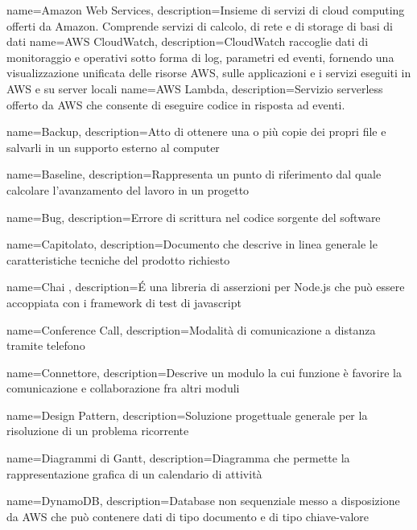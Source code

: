{
	name={Amazon Web Services},
	description={Insieme di servizi di cloud computing offerti da Amazon. Comprende servizi di calcolo, di rete e di storage di basi di dati}
}
{
	name={AWS CloudWatch},
	description={CloudWatch raccoglie dati di monitoraggio e operativi sotto forma di log, parametri ed eventi, fornendo una visualizzazione unificata delle risorse AWS, sulle applicazioni e i servizi eseguiti in AWS e su server locali}
}
{
	name={AWS Lambda},
	description={Servizio serverless offerto da AWS che consente di eseguire codice in risposta ad eventi.}
	{\newpage}
}

{
	name={Backup},
	description={Atto di ottenere una o più copie dei propri file e salvarli in un supporto esterno al computer}
}

{
	name={Baseline},
	description={Rappresenta un punto di riferimento dal quale calcolare l’avanzamento del lavoro in un progetto}
}

{
	name={Bug},
	description={Errore di scrittura nel codice sorgente del software}
	{\newpage}
}

{
	name={Capitolato},
	description={Documento che descrive in linea generale le caratteristiche tecniche del prodotto richiesto}
}

{
	name={Chai },
	description={É una libreria di asserzioni per Node.js che può essere accoppiata con i framework di test di javascript}
}

{
	name={Conference Call},
	description={Modalità di comunicazione a distanza tramite telefono}
}

{
	name={Connettore},
	description={Descrive un modulo la cui funzione è favorire la comunicazione e collaborazione fra altri moduli}
	{\newpage}
}

{
	name={Design Pattern},
	description={Soluzione progettuale generale per la risoluzione di un problema ricorrente}
}

{
	name={Diagrammi di Gantt},
	description={Diagramma che permette la rappresentazione grafica di un calendario di attività}
}

{
	name={DynamoDB},
	description={Database non sequenziale messo a disposizione da AWS che può contenere dati di tipo documento e di tipo chiave-valore}
	{\newpage}
}

